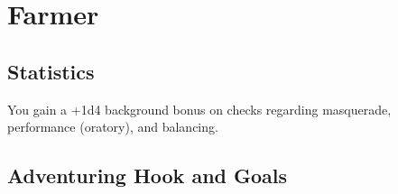 \section{Farmer}\label{background:farmer}

\subsection{Statistics}
You gain a +1d4 background bonus on checks regarding masquerade, performance (oratory), and balancing.

\subsection{Adventuring Hook and Goals}
